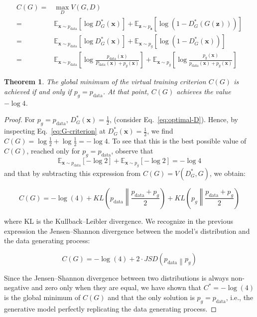 \documentclass{article} %
\newtheorem{theorem}{Theorem}
\begin{document}
\begin{align}
\label{eq:G-criterion}
 C(G) =& \max_D V(G,D) \nonumber \\
      =& \mathbb{E}_{\bm{x} \sim p_\text{data}}[\log D^*_G(\bm{x})] + \mathbb{E}_{\bm{z} \sim p_{\bm{z}}}[\log (1 - D^*_G(G(\bm{z})))] \\
      =& \mathbb{E}_{\bm{x} \sim p_\text{data}}[\log D^*_G(\bm{x})] + \mathbb{E}_{\bm{x} \sim p_g}[\log (1 - D^*_G(\bm{x}))] \nonumber \\
      =& \mathbb{E}_{\bm{x} \sim p_\text{data}}\left[\log \frac{p_\text{data}(\bm{x})}{P_\text{data}(\bm{x}) + p_g(\bm{x})}\right] + 
         \mathbb{E}_{\bm{x} \sim p_g}\left[\log \frac{p_g(\bm{x})}{p_\text{data}(\bm{x}) + p_g(\bm{x})}\right] \nonumber  
\end{align}

\begin{theorem}
\label{thm:global-optimality}
The global minimum of the virtual training criterion $C(G)$ is achieved if and only if $p_g=p_\text{data}$.
At that point, $C(G)$ achieves the value $-\log 4$.
\end{theorem}

\begin{proof}
For $p_g=p_\text{data}$, $D^*_G(\bm{x})=\frac{1}{2}$, (consider Eq.~\ref{eq:optimal-D}). Hence, by inspecting Eq.~\ref{eq:G-criterion} at $D^*_G(\bm{x})=\frac{1}{2}$, we find $C(G)=\log\frac{1}{2} + \log\frac{1}{2}= - \log 4$. To see that this is the best possible value of $C(G)$, reached only for $p_g = p_\text{data}$, observe that
\[
 \mathbb{E}_{\bm{x} \sim p_\text{data}} \left[ - \log 2 \right] + \mathbb{E}_{\bm{x} \sim p_g} \left[ - \log 2 \right] = -\log 4
\]
and that by subtracting this expression from $C(G) = V(D_G^*,G)$, we obtain:

\begin{equation}
C(G) = -\log(4) + KL \left(p_\text{data} \left \| \frac{p_\text{data} + p_g}{2} \right. \right) + KL \left(p_g \left \| \frac{p_\text{data} + p_g}{2} \right. \right)
\end{equation}

where KL is the Kullback--Leibler divergence. We recognize in the previous expression the Jensen--Shannon divergence between the model's distribution and the data generating process:

\begin{equation}
C(G) = - \log(4) + 2 \cdot JSD \left(p_\text{data} \left \| p_g \right. \right)
\end{equation}

Since the Jensen--Shannon divergence between two distributions is always non-negative and zero only
when they are equal, we have shown that $ C^* = - \log (4)$ is the global minimum of $C(G)$ and
that the only solution is $p_g=p_\text{data}$, i.e., the generative model perfectly replicating the data generating process.
\end{proof}
\end{document}
